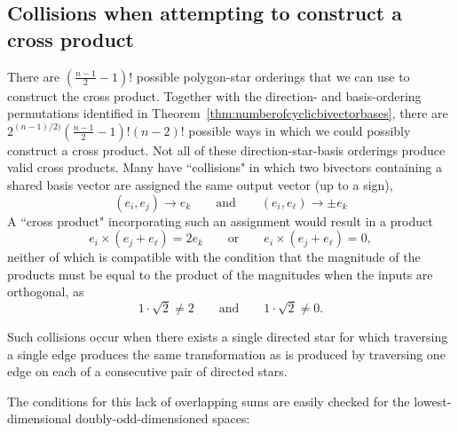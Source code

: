 \documentclass[11pt]{article}
\newcommand{\bv}[1][]{e_{#1}}
\newcommand{\bp}[2]{(#1,#2)}
\begin{document}


\subsection{Collisions when attempting to construct a cross product}
There are $ (\frac{n-1}{2} -1)! $ possible polygon-star orderings that we can use to construct the cross product. Together with the direction- and basis-ordering permutations identified in Theorem~\ref{thm:numberofcyclicbivectorbases}, there are $2^{(n-1)/2)} (\frac{n-1}{2} -1)!  (n-2)!$ possible ways in which we could possibly construct a cross product.
Not all of these  direction-star-basis orderings produce valid cross products. Many have ``collisions" in which two bivectors containing a shared basis vector are assigned the same output vector (up to a sign),
%
\begin{equation}
\bp{\bv[i]}{\bv[j]} \rightarrow \bv[k] \qquad \mathrm{and} \qquad \bp{\bv[i]}{\bv[\ell]} \rightarrow \pm\bv[k] 
\end{equation}
%
A ``cross product" incorporating such an assignment would result in a product
%
\begin{equation}
\bv[i] \times (\bv[j]+\bv[\ell]) = 2 \bv[k] \qquad \mathrm{or} \qquad \bv[i] \times (\bv[j]+\bv[\ell]) = 0,
\end{equation}
neither of which is compatible with the condition that the magnitude of the products must be equal to the product of the magnitudes when the inputs are orthogonal, as
\begin{equation} 
1 \cdot \sqrt{2} \neq 2 \qquad \mathrm{and} \qquad 1 \cdot \sqrt{2} \neq 0 .
\end{equation}


Such collisions occur when there exists a single directed star for which traversing a single edge produces the same transformation as is produced by traversing one edge on each of a consecutive pair of directed stars.

The conditions for this lack of overlapping sums are easily checked for the lowest-dimensional doubly-odd-dimensioned spaces:
\end{document}
